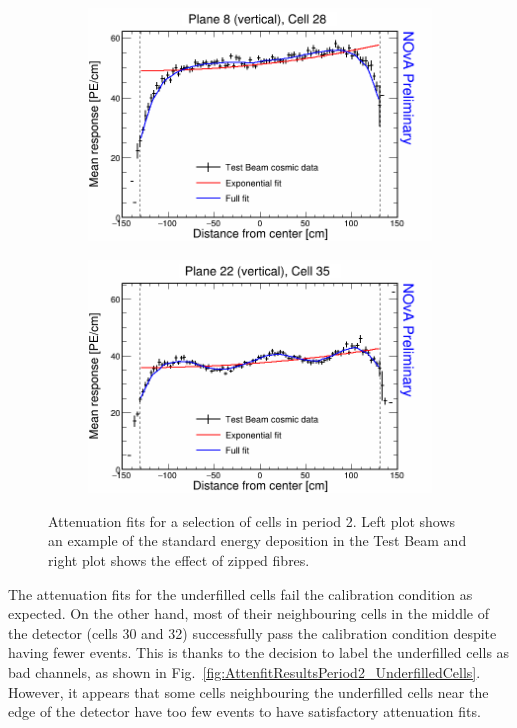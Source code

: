 \begin{figure}[!hbtp]
  \begin{subfigure}{0.495\textwidth}
    \includegraphics[width=\linewidth]{Plots/RelativeCalibrationResults/p2_008_028.png}
  \end{subfigure}
  \begin{subfigure}{0.495\textwidth}
    \includegraphics[width=\linewidth]{Plots/RelativeCalibrationResults/p2_022_035.png}
  \end{subfigure}
  \caption[Attenuation fits for standard cells in period 2 data]{Attenuation fits for a selection of cells in period 2. Left plot shows an example of the standard energy deposition in the Test Beam and right plot shows the effect of zipped fibres.}
  \label{fig:AttenfitResultsPeriod2_ZippedFibers}
\end{figure}

The attenuation fits for the underfilled cells fail the calibration condition as expected. On the other hand, most of their neighbouring cells in the middle of the detector (cells 30 and 32) successfully pass the calibration condition despite having fewer events. This is thanks to the decision to label the underfilled cells as bad channels, as shown in Fig.~\ref{fig:AttenfitResultsPeriod2_UnderfilledCells}. However, it appears that some cells neighbouring the underfilled cells near the edge of the detector have too few events to have satisfactory attenuation fits.

